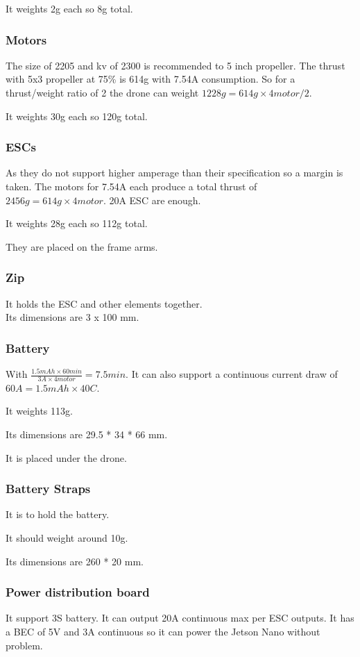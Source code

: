 It weights 2g each so 8g total.

\subsubsection{Motors}
The size of 2205 and kv of 2300 is recommended to 5 inch propeller. The thrust with 5x3 propeller at 75\% is 614g with 7.54A consumption. So for a thrust/weight ratio of 2 the drone can weight $1228g=614g \times 4motor / 2$.

It weights 30g each so 120g total.

\subsubsection{ESCs}
As they do not support higher amperage than their specification so a margin is taken. The motors for 7.54A each produce a total thrust of $2456g=614g\times 4motor$. 20A ESC are enough.

It weights 28g each so 112g total.

They are placed on the frame arms.

\subsubsection{Zip}
It holds the ESC and other elements together.\\
Its dimensions are 3 x 100 mm.

\subsubsection{Battery}
With $ \frac{1.5mAh \times 60min}{3A \times 4motor}= 7.5min$. It can also support a continuous current draw of $60A = 1.5mAh\times 40C$.

It weights 113g.

Its dimensions are 29.5 * 34 * 66 mm.

It is placed under the drone.

\subsubsection{Battery Straps}
It is to hold the battery.

It should weight around 10g.

Its dimensions are 260 * 20 mm.

\subsubsection{Power distribution board}
It support 3S battery. It can output 20A continuous max per ESC outputs. It has a BEC of 5V and 3A continuous so it can power the Jetson Nano without problem.

